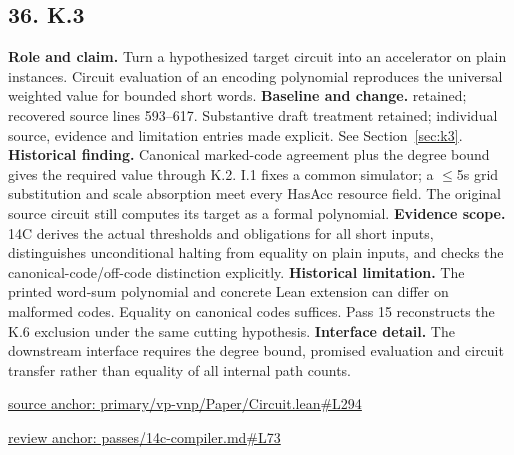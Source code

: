 \documentclass[11pt,letterpaper]{article}
\theoremstyle{definition}\newtheorem{definition}[theorem]{Definition}\newtheorem{example}[theorem]{Example}
\theoremstyle{remark}\newtheorem{remark}[theorem]{Remark}
\begin{document}
\subsection*{36. K.3}
\textbf{Role and claim.} Turn a hypothesized target circuit into an accelerator on plain instances. Circuit evaluation of an encoding polynomial reproduces the universal weighted value for bounded short words.
\textbf{Baseline and change.} retained; recovered source lines 593--617. Substantive draft treatment retained; individual source, evidence and limitation entries made explicit. See Section~\ref{sec:k3}.
\textbf{Historical finding.} Canonical marked-code agreement plus the degree bound gives the required value through K.2. I.1 fixes a common simulator; a \ensuremath{\le}5s grid substitution and scale absorption meet every HasAcc resource field. The original source circuit still computes its target as a formal polynomial.
\textbf{Evidence scope.} 14C derives the actual thresholds and obligations for all short inputs, distinguishes unconditional halting from equality on plain inputs, and checks the canonical-code/off-code distinction explicitly.
\textbf{Historical limitation.} The printed word-sum polynomial and concrete Lean extension can differ on malformed codes. Equality on canonical codes suffices. Pass 15 reconstructs the K.6 exclusion under the same cutting hypothesis.
\textbf{Interface detail.} The downstream interface requires the degree bound, promised evaluation and circuit transfer rather than equality of all internal path counts.
\par\href{https://github.com/nousentllc/VP-VNP-Review/blob/8a7976933b6b2b4ffda1ad3a0dfb5fc6b6f023e8/primary/vp-vnp/Paper/Circuit.lean\#L294}{source anchor: primary/vp-vnp/Paper/Circuit.lean\#L294}
\par\href{https://github.com/nousentllc/VP-VNP-Review/blob/8a7976933b6b2b4ffda1ad3a0dfb5fc6b6f023e8/passes/14c-compiler.md\#L73}{review anchor: passes/14c-compiler.md\#L73}
\goodbreak
\end{document}
